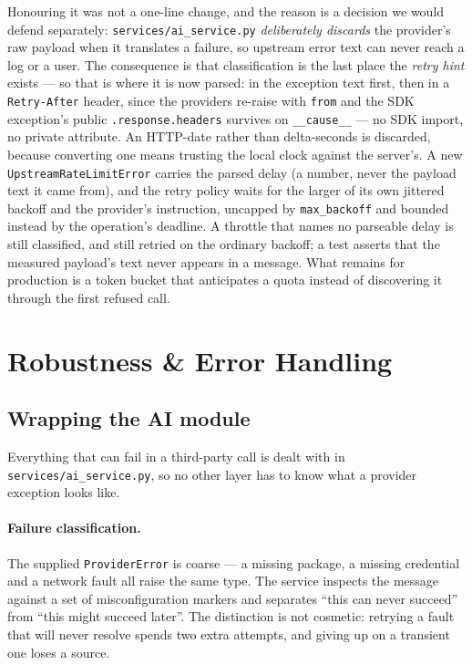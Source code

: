 \documentclass[10pt,a4paper]{article}
\begin{document}
Honouring it was not a one-line change, and the reason is a decision we would defend separately:
\texttt{services/ai\_service.py} \emph{deliberately discards} the provider's raw payload when it
translates a failure, so upstream error text can never reach a log or a user. The consequence is
that classification is the last place the \emph{retry hint} exists --- so that is where it is now
parsed: in the exception text first, then in a \texttt{Retry-After} header, since the providers
re-raise with \texttt{from} and the SDK exception's public \texttt{.response.headers} survives
on \texttt{\_\_cause\_\_} --- no SDK import, no private attribute. An HTTP-date rather than
delta-seconds is discarded, because converting one means trusting the local clock against the
server's. A new \texttt{UpstreamRateLimitError} carries the parsed delay (a number,
never the payload text it came from), and the retry policy waits for the larger of its own
jittered backoff and the provider's instruction, uncapped by \texttt{max\_backoff} and bounded
instead by the operation's deadline. A throttle that names no parseable delay is still classified, and still retried on the ordinary
backoff; a test asserts that the measured payload's text never appears in a message.
What remains for production is a token bucket that anticipates a quota instead of discovering
it through the first refused call.

\section{Robustness \& Error Handling}

\subsection{Wrapping the AI module}

Everything that can fail in a third-party call is dealt with in \texttt{services/ai\_service.py},
so no other layer has to know what a provider exception looks like.

\paragraph{Failure classification.} The supplied \texttt{ProviderError} is coarse --- a missing
package, a missing credential and a network fault all raise the same type. The service inspects
the message against a set of misconfiguration markers and separates ``this can never succeed''
from ``this might succeed later''. The distinction is not cosmetic: retrying a fault that will
never resolve spends two extra attempts, and giving up on a transient one loses a source.
\end{document}
